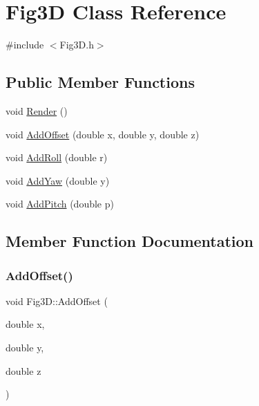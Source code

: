 \hypertarget{classFig3D}{}\section{Fig3D Class Reference}
\label{classFig3D}


{\ttfamily \#include $<$Fig3\+D.\+h$>$}

\subsection*{Public Member Functions}
\begin{DoxyCompactItemize}
\item 
void \hyperlink{classFig3D_a7240f4cd944cfe9595cfb3d48fe422cd}{Render} ()
\item 
void \hyperlink{classFig3D_aff1f932bd45c61bce47dc452bf93c900}{Add\+Offset} (double x, double y, double z)
\item 
void \hyperlink{classFig3D_af26cb06e501da42b688c9e67b8c9dba3}{Add\+Roll} (double r)
\item 
void \hyperlink{classFig3D_ae44cbf728ebb3702cf064e2b5c7ce66f}{Add\+Yaw} (double y)
\item 
void \hyperlink{classFig3D_a03ede2e2e52cd91ca639ee12a2eadb02}{Add\+Pitch} (double p)
\end{DoxyCompactItemize}


\subsection{Member Function Documentation}
\mbox{\label{classFig3D_aff1f932bd45c61bce47dc452bf93c900}} 
\subsubsection{\texorpdfstring{Add\+Offset()}{AddOffset()}}
{\footnotesize\ttfamily void Fig3\+D\+::\+Add\+Offset (\begin{DoxyParamCaption}\item[{double}]{x,  }\item[{double}]{y,  }\item[{double}]{z }\end{DoxyParamCaption})}

\mbox{\label{classFig3D_a03ede2e2e52cd91ca639ee12a2eadb02}} 
